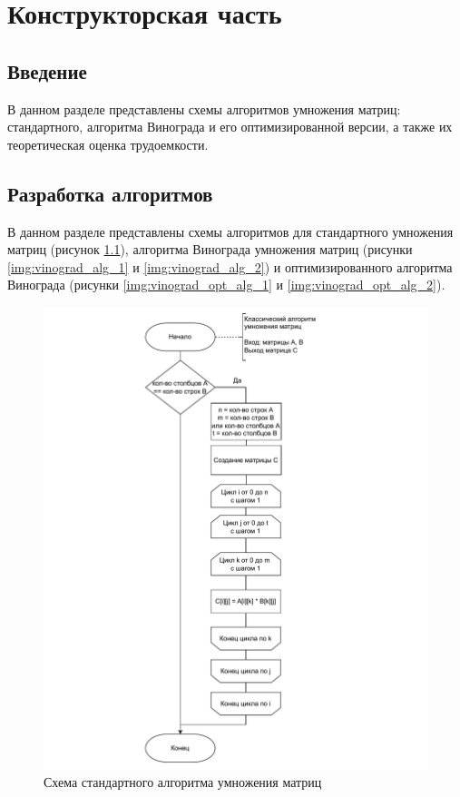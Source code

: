 \chapter{Конструкторская часть}

\section{Введение}
В данном разделе представлены схемы алгоритмов умножения матриц: стандартного, алгоритма Винограда и его оптимизированной версии, а также их теоретическая оценка трудоемкости.

\section{Разработка алгоритмов}
В данном разделе представлены схемы алгоритмов для стандартного умножения матриц (рисунок \ref{img:standart}), алгоритма Винограда умножения матриц (рисунки \ref{img:vinograd_alg_1} и \ref{img:vinograd_alg_2}) и оптимизированного алгоритма Винограда (рисунки \ref{img:vinograd_opt_alg_1} и \ref{img:vinograd_opt_alg_2}).

\begin{figure}[h]
	\centering
	\includegraphics[width=1\linewidth]{img/standart.pdf}
	\caption{Схема стандартного алгоритма умножения матриц}
	\label{img:standart}
\end{figure}

